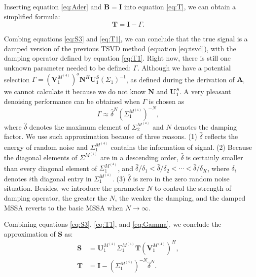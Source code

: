 Inserting equation \ref{eq:Ader} and  $\mathbf{B}=\mathbf{I}$  into equation \ref{eq:T}, we can obtain a simplified formula:
\begin{equation}
\label{eq:T1}
\mathbf{T} = \mathbf{I}-\Gamma.
\end{equation}

Combing equations \ref{eq:S3} and \ref{eq:T1}, we can conclude that the true signal is a damped version of the previous TSVD method (equation \ref{eq:tsvd}), with the damping operator defined by equation \ref{eq:T1}. Right now, there is still one unknown parameter needed to be defined: $\Gamma$. Although we have a potential selection  $\Gamma=(\mathbf{V}_1^{M^{(4)}})^{o}\mathbf{N}^H\mathbf{U}_1^S(\Sigma_1)^{-1}$, as defined during the derivation of $\mathbf{A}$, we cannot calculate it because we do not know $\mathbf{N}$ and $\mathbf{U}_1^S$. A very pleasant denoising performance can be obtained when $\Gamma$ is chosen as
\begin{equation}
\label{eq:Gamma}
\Gamma \approx \hat{\delta}^N\left(\Sigma_1^{M^{(4)}}\right)^{-N},
\end{equation}
where $\hat{\delta}$ denotes the maximum element of $\Sigma_2^{M^{(4)}}$ and $N$ denotes the damping factor. We use such approximation because of three reasons. (1) $\hat{\delta}$ reflects the energy of random noise and $ \Sigma_1^{M^{(4)}} $ contains the information of signal. (2) Because the diagonal  elements of $ \Sigma^{M^{(4)}} $ are in a descending order, $\hat{\delta} $  is certainly smaller than every diagonal element of $ \Sigma_1^{M^{(4)}} $, and  $ \hat{\delta}/\delta_1<\hat{\delta}/\delta_2<\cdots<\hat{\delta}/\delta_K $, where $\delta_i$ denotes $i$th diagonal entry in $\Sigma_1^{M^{(4)}}$. (3) $\hat{\delta}$ is zero in the zero random noise situation. Besides, we introduce the parameter $ N $ to control the strength of damping operator, the greater the $ N $, the weaker the damping, and the damped MSSA reverts to the basic MSSA when $ N\to\infty $.


Combining equations \ref{eq:S3}, \ref{eq:T1}, and \ref{eq:Gamma}, we conclude the approximation of $\mathbf{S}$ as:
\begin{align}
\label{eq:S4}
\mathbf{S} & = \mathbf{U}_1^{M^{(4)}} \Sigma_1^{M^{(4)}}\mathbf{T}(\mathbf{V}_1^{M^{(4)}})^H,\\
\label{eq:T2}
\mathbf{T} & =\mathbf{I}-(\Sigma_1^{M^{(4)}})^{-N}\hat{\delta}^N.
\end{align} 

\newpage
\appendix
